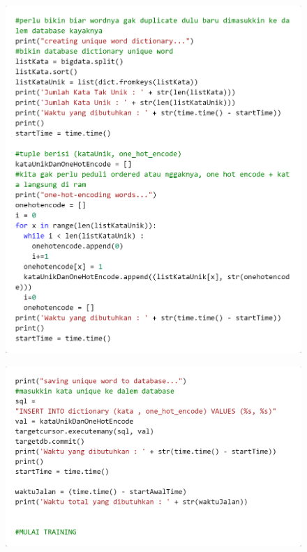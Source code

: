 \documentclass[12pt]{report}
\begin{document}
\begin{figure}[H]
\centering
\includegraphics[scale=0.3]{onehotencode4}
\end{figure}
\begin{figure}[H]
\centering
\includegraphics[scale=0.3]{onehotencode5}
\end{figure}
\end{document}
